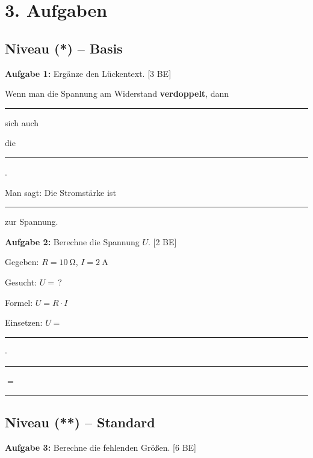 \documentclass[11pt, a4paper]{article}
\newcommand{\luecke}[1]{\rule{#1}{0.4pt}}
\newcommand{\niveauEins}{\textcolor{stern1}{\textbf{(*)}}}
\newcommand{\niveauZwei}{\textcolor{stern2}{\textbf{(**)}}}
\newcommand{\punkte}[1]{\hfill\textcolor{grau}{\small[#1 BE]}}
\begin{document}
\vspace{0.5em}


\section*{3. Aufgaben}

\subsection*{Niveau \niveauEins{} -- Basis}

\textbf{Aufgabe 1:} Ergänze den Lückentext. \punkte{3}

Wenn man die Spannung am Widerstand \textbf{verdoppelt}, dann \luecke{3cm} sich auch

die \luecke{3cm}.

Man sagt: Die Stromstärke ist \luecke{3cm} zur Spannung.

\vspace{1.5em}

\textbf{Aufgabe 2:} Berechne die Spannung $U$. \punkte{2}

\begin{tcolorbox}[colback=white, colframe=physik!50, boxrule=0.5pt, arc=0pt]
Gegeben: $R = \SI{10}{\ohm}$, \quad $I = \SI{2}{\ampere}$

\vspace{0.5em}
Gesucht: $U = \,?$

\vspace{0.5em}
Formel: $U = R \cdot I$

\vspace{0.5em}
Einsetzen: $U = $ \luecke{1.5cm} $\cdot$ \luecke{1.5cm} $=$ \luecke{2cm}
\end{tcolorbox}

\vspace{1em}


\subsection*{Niveau \niveauZwei{} -- Standard}

\textbf{Aufgabe 3:} Berechne die fehlenden Größen. \punkte{6}
\end{document}
